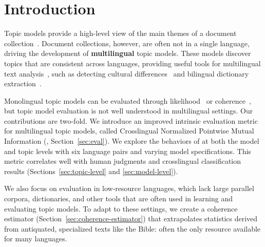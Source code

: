 \section{Introduction}
\label{intro}


Topic models provide a high-level view of the main
themes of a document collection~\cite{Boyd-Graber-17}.
Document collections, however, are
often not in a single language, driving the development of
\textbf{multilingual} topic models.  These models discover topics that
are consistent across languages, providing useful tools for
multilingual text analysis~\cite{VulicSTM15}, such as detecting
cultural differences~\cite{GutierrezSLMG16} and bilingual dictionary
extraction~\cite{LiuDM15}.


Monolingual topic models can be evaluated through
likelihood~\cite{WallachMSM09} or coherence~\cite{NewmanLGB10}, but
topic model evaluation is not well understood in multilingual settings.
Our contributions are two-fold.
	We introduce an improved intrinsic evaluation metric for multilingual topic models,
	called Crosslingual Normalized Pointwise Mutual Information (\cnpmi{}, Section~\ref{sec:eval}).
	We explore the behaviors of \cnpmi{} at both the model and topic levels
	with six language pairs and varying model specifications.
	This metric correlates well with human judgments
	and crosslingual classification results
	(Sections~\ref{sec:topic-level} and
	\ref{sec:model-level}).
	
We also focus on evaluation in low-resource languages,
which lack large parallel corpora, dictionaries,
and other tools that
are often used in learning and evaluating topic models.
To adapt \cnpmi{} to these settings, we create a coherence estimator
(Section~\ref{sec:coherence-estimator}) that extrapolates statistics
derived from antiquated, specialized texts like the Bible:
often the only resource available for many languages.  





